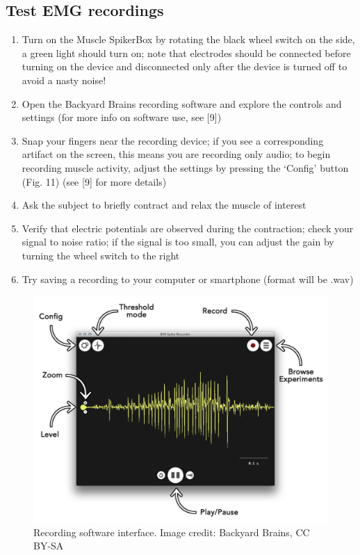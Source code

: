\documentclass{article}
\begin{document}
\subsection{Test EMG recordings}

\begin{enumerate}
\item Turn on the Muscle SpikerBox by rotating the black wheel switch on the side, a green light should turn on; note that electrodes should be connected before turning on the device and disconnected only after the device is turned off to avoid a nasty noise!
\item Open the Backyard Brains recording software and explore the controls and settings (for more info on software use, see [9])
\item Snap your fingers near the recording device; if you see a corresponding artifact on the screen, this means you are recording only audio; to begin recording muscle activity, adjust the settings by pressing the `Config' button (Fig. 11) (see [9] for more details)
\item Ask the subject to briefly contract and relax the muscle of interest
\item Verify that electric potentials are observed during the contraction; check your signal to noise ratio; if the signal is too small, you can adjust the gain by turning the wheel switch to the right
\item Try saving a recording to your computer or smartphone (format will be .wav)
\end{enumerate}

\begin{figure}[!htbp]
\centering
\includegraphics[width=0.7\linewidth]{files/EPpXta8zJdzN048lz8AR-b163ddb803d9c2374253fd810df7f6db.png}
\caption[]{Recording software interface. Image credit: Backyard Brains, CC BY-SA}
\label{ZQ0bBDXlmW}
\end{figure}
\end{document}
